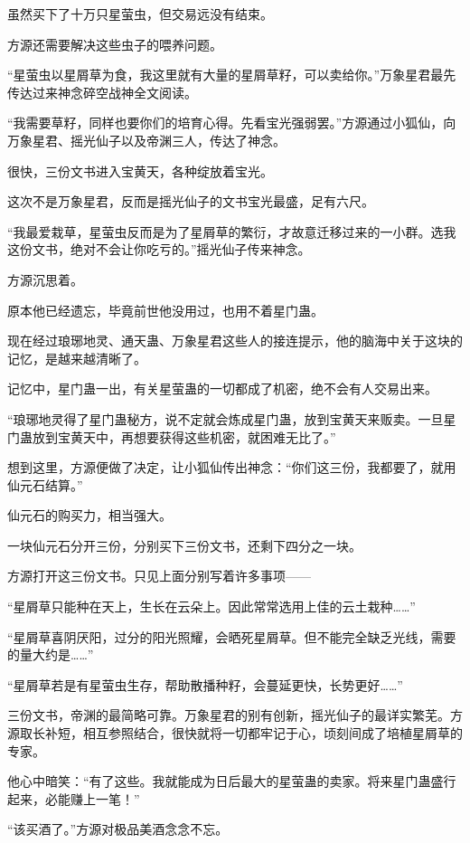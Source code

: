 
\begin{this_body}

虽然买下了十万只星萤虫，但交易远没有结束。

方源还需要解决这些虫子的喂养问题。

“星萤虫以星屑草为食，我这里就有大量的星屑草籽，可以卖给你。”万象星君最先传达过来神念碎空战神全文阅读。

“我需要草籽，同样也要你们的培育心得。先看宝光强弱罢。”方源通过小狐仙，向万象星君、摇光仙子以及帝渊三人，传达了神念。

很快，三份文书进入宝黄天，各种绽放着宝光。

这次不是万象星君，反而是摇光仙子的文书宝光最盛，足有六尺。

“我最爱栽草，星萤虫反而是为了星屑草的繁衍，才故意迁移过来的一小群。选我这份文书，绝对不会让你吃亏的。”摇光仙子传来神念。

方源沉思着。

原本他已经遗忘，毕竟前世他没用过，也用不着星门蛊。

现在经过琅琊地灵、通天蛊、万象星君这些人的接连提示，他的脑海中关于这块的记忆，是越来越清晰了。

记忆中，星门蛊一出，有关星萤蛊的一切都成了机密，绝不会有人交易出来。

“琅琊地灵得了星门蛊秘方，说不定就会炼成星门蛊，放到宝黄天来贩卖。一旦星门蛊放到宝黄天中，再想要获得这些机密，就困难无比了。”

想到这里，方源便做了决定，让小狐仙传出神念：“你们这三份，我都要了，就用仙元石结算。”

仙元石的购买力，相当强大。

一块仙元石分开三份，分别买下三份文书，还剩下四分之一块。

方源打开这三份文书。只见上面分别写着许多事项——

“星屑草只能种在天上，生长在云朵上。因此常常选用上佳的云土栽种……”

“星屑草喜阴厌阳，过分的阳光照耀，会晒死星屑草。但不能完全缺乏光线，需要的量大约是……”

“星屑草若是有星萤虫生存，帮助散播种籽，会蔓延更快，长势更好……”

三份文书，帝渊的最简略可靠。万象星君的别有创新，摇光仙子的最详实繁芜。方源取长补短，相互参照结合，很快就将一切都牢记于心，顷刻间成了培植星屑草的专家。

他心中暗笑：“有了这些。我就能成为日后最大的星萤蛊的卖家。将来星门蛊盛行起来，必能赚上一笔！”

“该买酒了。”方源对极品美酒念念不忘。


\end{this_body}
